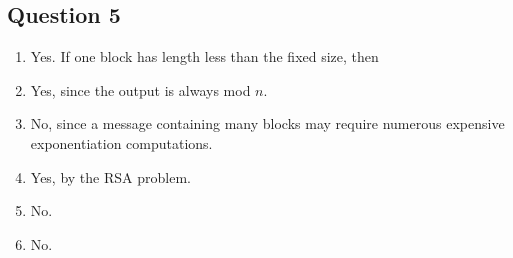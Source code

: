 \documentclass[12pt]{article}
\begin{document}
\subsection*{Question 5}
\begin{enumerate}
\item Yes. If one block has length less than the fixed size, then 

\item Yes, since the output is always mod $n$.

\item No, since a message containing many blocks may require numerous expensive exponentiation computations.

\item Yes, by the RSA problem.

\item No.

\item No.
\end{enumerate}
\end{document}
